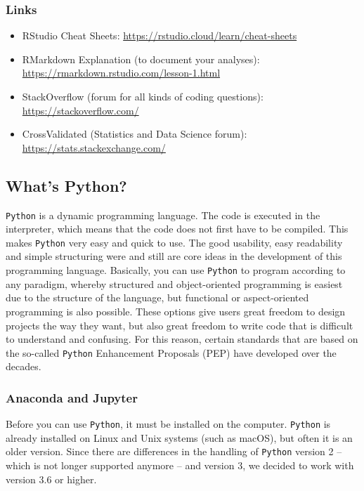 \documentclass[
  11pt,
]{article}
\providecommand{\tightlist}{%
  \setlength{\itemsep}{0pt}\setlength{\parskip}{0pt}}
\begin{document}
\hypertarget{links}{%
\subsubsection{Links}\label{links}}

\begin{itemize}
\tightlist
\item
  RStudio Cheat Sheets: \url{https://rstudio.cloud/learn/cheat-sheets}
\item
  RMarkdown Explanation (to document your analyses): \url{https://rmarkdown.rstudio.com/lesson-1.html}
\item
  StackOverflow (forum for all kinds of coding questions): \url{https://stackoverflow.com/}
\item
  CrossValidated (Statistics and Data Science forum): \url{https://stats.stackexchange.com/}
\end{itemize}

\hypertarget{whats-python}{%
\subsection{What's Python?}\label{whats-python}}

\texttt{Python} is a dynamic programming language. The code is executed in the interpreter, which means that the code does not first have to be compiled. This makes \texttt{Python} very easy and quick to use. The good usability, easy readability and simple structuring were and still are core ideas in the development of this programming language.
Basically, you can use \texttt{Python} to program according to any paradigm, whereby structured and object-oriented programming is easiest due to the structure of the language, but functional or aspect-oriented programming is also possible. These options give users great freedom to design projects the way they want, but also great freedom to write code that is difficult to understand and confusing. For this reason, certain standards that are based on the so-called \texttt{Python} Enhancement Proposals (PEP) have developed over the decades.

\hypertarget{anaconda-and-jupyter}{%
\subsubsection{Anaconda and Jupyter}\label{anaconda-and-jupyter}}

Before you can use \texttt{Python}, it must be installed on the computer. \texttt{Python} is already installed on Linux and Unix systems (such as macOS), but often it is an older version. Since there are differences in the handling of \texttt{Python} version 2 -- which is not longer supported anymore -- and version 3, we decided to work with version 3.6 or higher.
\end{document}
